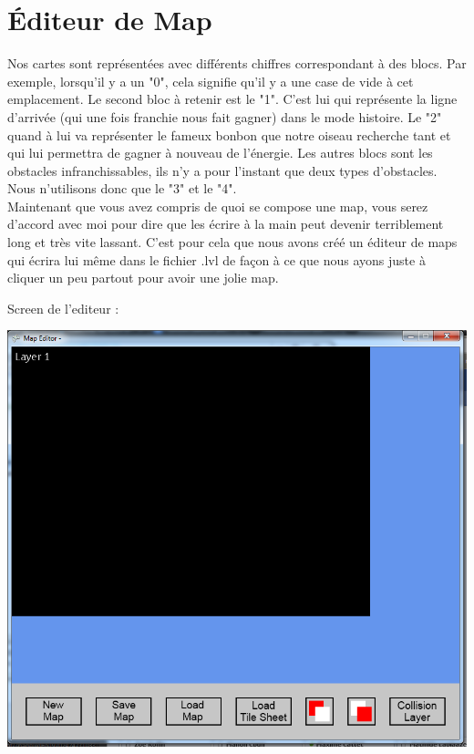 \documentclass [11pt]{report}
\begin{document}
		
		
	\section{\'Editeur de Map}
						
			Nos cartes sont représentées avec différents chiffres correspondant à des blocs. Par exemple, lorsqu'il y a un "0", cela signifie qu'il y a une case de vide à cet emplacement. Le second bloc à retenir est le "1". C'est lui qui représente la ligne d'arrivée (qui une fois franchie nous fait gagner) dans le mode histoire. Le "2" quand à lui va représenter le fameux bonbon que notre oiseau recherche tant et qui lui permettra de gagner à nouveau de l'énergie. Les autres blocs sont les obstacles infranchissables, ils n'y a pour l'instant que deux types d'obstacles. Nous n'utilisons donc que le "3" et le "4".\\
			
			\indent Maintenant que vous avez compris de quoi se compose une map, vous serez d'accord avec moi pour dire que les écrire à la main peut devenir terriblement long et très vite lassant. C'est pour cela que nous avons créé un éditeur de maps qui écrira lui même dans le fichier .lvl de façon à ce que nous ayons juste à cliquer un peu partout pour avoir une jolie map.
			
			\vspace{10mm}
			
	\noindent Screen de l'editeur : 
						
		\vspace{4mm}
		
			\begin{center}
			\includegraphics[scale = 0.4]{images/EditeurMap.png}
			\end{center}
			
\end{document}
